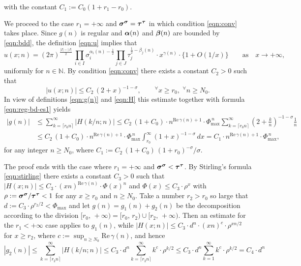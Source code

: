 \documentclass[a4paper,12pt]{article}
\theoremstyle{plain}
\def\rRe{\mathrm{Re}}
\def\N{\mathbb{N}}
\def\bal{\mbox{\boldmath $\alpha$}}
\def\bbeta{\mbox{\boldmath $\beta$}}
\def\bsigma{\mbox{\boldmath $\sigma$}}
\def\sbsigma{\mbox{\boldmath ${\scriptstyle \sigma}$}}
\def\btau{\mbox{\boldmath $\tau$}}
\def\sbtau{\mbox{\boldmath ${\scriptstyle \tau}$}}
\def\Phim{\Phi_{\scriptstyle \mathrm{max}}}
\begin{document}
with the constant $C_1 := C_0 (1+r_1-r_0)$.   
\par
We proceed to the case $r_1 = + \infty$ and $\bsigma^{\sbsigma} = 
\btau^{\sbtau}$ in which condition \eqref{eqn:conv} takes place.    
Since $g(n)$ is regular and $\bal(n)$ and $\bbeta(n)$ are bounded by  
\eqref{eqn:bdd}, the definition \eqref{eqn:u} implies that 
\[
u(x; n) = 
(2 \pi)^{ \frac{|I|-|J|}{2} } \, 
\prod_{i \in I} \sigma_i^{\alpha_i(n) - \frac{1}{2}} 
\prod_{j \in J} \tau_j^{\frac{1}{2}-\beta_j(n)} \cdot x^{\gamma(n)} 
\cdot \{ 1 + O(1/x) \} \qquad \mbox{as} \quad x \to + \infty, 
\]
uniformly for $n \in \N$. 
By condition \eqref{eqn:conv} there exists a constant $C_2 > 0$ 
such that       
\[
|u(x; n)| \le C_2 \, (2+x)^{-1-\sigma}, \qquad 
{}^{\forall} x \ge r_0, \,\, {}^{\forall} n \ge N_0.     
\]
In view of definitions \eqref{eqn:g(n)} and \eqref{eqn:H} this estimate 
together with formula \eqref{eqn:reg-bd-es1} yields 
\begin{align*}
|g(n)| &\le \sum_{k=\lceil r_0 n \rceil}^{\infty} |H(k/n; n)| 
\le C_2 \, (1+C_0) \cdot n^{\rRe \, \gamma(n) +1} \cdot \Phim^{\, n} 
\sum_{k=\lceil r_0 n \rceil}^{\infty} 
\left( 2+\frac{k}{n} \right)^{-1-\sigma} \frac{1}{n} \\
& \le C_2 \, (1+C_0) \cdot n^{\rRe \, \gamma(n) +1} \cdot \Phim^{\, n} 
\int_{r_0}^{\infty} \left( 1+ x \right)^{-1-\sigma} \, d x = C_1 \cdot 
n^{\rRe \, \gamma(n) + 1} \cdot \Phim^{\, n}, 
\end{align*}
for any integer $n \ge N_0$, where $C_1 := C_2 \, (1+C_0)\, 
(1+r_0)^{-\sigma}/\sigma $.  
\par
The proof ends with the case where $r_1 = + \infty$ and 
$\bsigma^{\sbsigma} < \btau^{\sbtau}$. 
By Stirling's formula \eqref{eqn:stirling} there exists a constant 
$C_3 > 0$ such that $|H(x; n)| \le C_3 \cdot (x n)^{\rRe \, \gamma(n)} 
\cdot \Phi(x)^n$ and $\Phi(x) \le C_3 \cdot \rho^x$ with 
$\rho := \bsigma^{\sbsigma}/\btau^{\sbtau} < 1$  
for any $x \ge r_0$ and $n \ge N_0$. 
Take a number $r_2 > r_0$ so large that 
$d := C_3 \cdot \rho^{r_2/2} < \Phim$ and let $g(n) = g_1(n) + g_2(n)$ 
be the decomposition according to the division 
$[r_0, \,+\infty) = [r_0, \, r_2) \cup [r_2, \, +\infty)$.  
Then an estimate for the $r_1 < + \infty$ case applies to 
$g_1(n)$, while $|H(x; n)| \le C_3 \cdot d^n \cdot (x n)^c \cdot 
\rho^{x n/2}$ for $x \ge r_2$, where $c := \sup_{n \ge N_0} 
\rRe \, \gamma(n)$, and hence     
\[
|g_2(n)| \le \sum_{k=\lceil r_2 n \rceil}^{\infty} |H(k/n; n)| \le 
C_3 \cdot d^n \sum_{k = \lceil r_2 n \rceil}^{\infty} k^c \cdot \rho^{k/2} 
\le C_3 \cdot d^n \sum_{k = 1}^{\infty} k^c \cdot \rho^{k/2} 
= C_4 \cdot d^n   
\]
\end{document}
